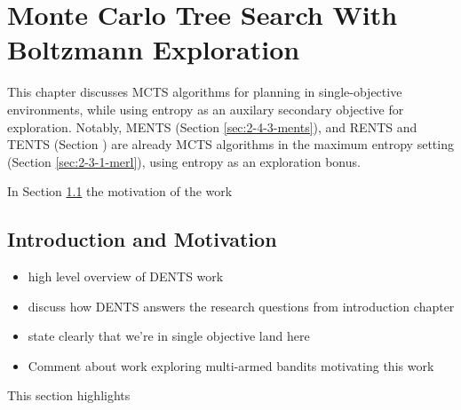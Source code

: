 

\chapter{\label{ch:4-dents}Monte Carlo Tree Search With Boltzmann Exploration} 

    \minitoc

    This chapter discusses MCTS algorithms for planning in single-objective environments, while using entropy as an auxilary secondary objective for exploration. Notably, MENTS (Section \ref{sec:2-4-3-ments}), and RENTS and TENTS (Section ) are already MCTS algorithms in the maximum entropy setting (Section \ref{sec:2-3-1-merl}), using entropy as an exploration bonus.

    In Section \ref{sec:4-1-intro} the motivation of the work 

\section{Introduction and Motivation}
\label{sec:4-1-intro}

    \begin{itemize}
        \item high level overview of DENTS work
        \item discuss how DENTS answers the research questions from introduction chapter
        \item state clearly that we're in single objective land here
        \item Comment about work exploring multi-armed bandits motivating this work
    \end{itemize}


    This section highlights 



    
